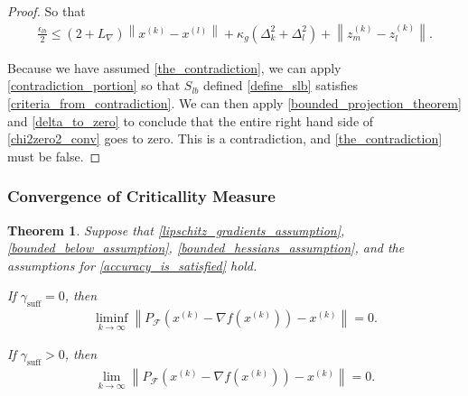 \documentclass{article}
\newtheorem{theorem}{Theorem}[section]
\theoremstyle{case}
\numberwithin{theorem}{subsection}
\newcommand{\dk}{\Delta_k}
\newcommand{\dl}{\Delta_l}
\newcommand{\feasible}{{\mathcal F}}
\newcommand{\gammabi}{\gamma_{\textrm{suff}}}
\newcommand{\gradf}{\nabla f}
\newcommand{\lipgrad}{{L_{\nabla}}}
\newcommand{\xk}{x^{(k)}}
\newcommand{\xl}{{x^{(l)}}}
\newcommand{\zmk}{{z_m^{(k)}}}
\newcommand{\zlk}{{z_l^{(k)}}}
\begin{document}
\begin{proof}
So that
\begin{align}
\frac{\epsilon_{lb}} 2 \le \left(2 + \lipgrad\right) \left\|\xk - \xl\right\| 
+ \kappa_g \left(\dk^2 + \dl^2\right)
+ \left\|\zmk - \zlk\right\|
\label{chi2zero2_conv}.
\end{align}

Because we have assumed \cref{the_contradiction}, we can apply \cref{contradiction_portion} so that 
$S_{lb}$ defined \cref{define_slb} satisfies \cref{criteria_from_contradiction}.
We can then apply \cref{bounded_projection_theorem} and \cref{delta_to_zero} to conclude that the entire right hand side of \cref{chi2zero2_conv} goes to zero.
This is a contradiction, and \cref{the_contradiction} must be false.
\end{proof}

\subsubsection{Convergence of Criticallity Measure}
\label{limit_of_true_criticallity}

\begin{theorem}
\label{the_convergence_theorem}
Suppose that \cref{lipschitz_gradients_assumption}, \cref{bounded_below_assumption}, \cref{bounded_hessians_assumption}, and 
the assumptions for \cref{accuracy_is_satisfied} hold.

If $\gammabi = 0$, then
\begin{align}
\liminf_{k\to\infty} \left\|P_{\feasible}\left(\xk - \gradf\left(\xk\right)\right) - \xk \right\| = 0.
\end{align}

If $\gammabi > 0$, then
\begin{align}
\lim_{k\to\infty} \left\|P_{\feasible}\left(\xk - \gradf\left(\xk\right)\right) - \xk \right\| = 0.
\end{align}

\end{theorem}
\end{document}
